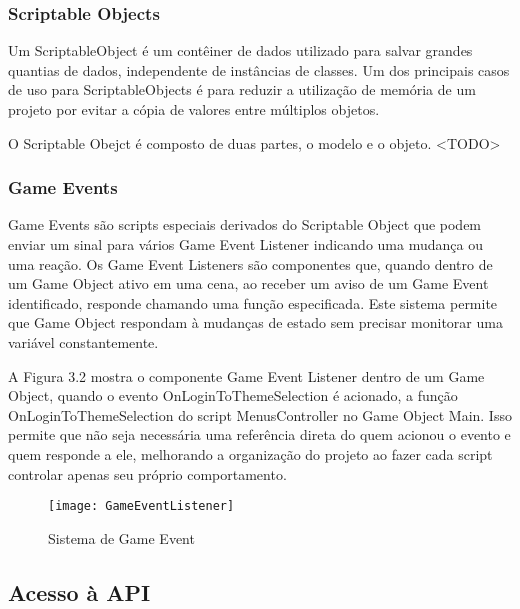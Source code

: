 \subsubsection{Scriptable Objects}
\label{subsubsec:scriptableobjects}

Um ScriptableObject é um contêiner de dados utilizado para salvar grandes quantias de dados, independente de instâncias de classes. Um dos principais casos de uso para ScriptableObjects é para reduzir a utilização de memória de um projeto por evitar a cópia de valores entre múltiplos objetos.\cite{scriptableobject}

O Scriptable Obejct é composto de duas partes, o modelo e o objeto. <TODO>

\subsubsection{Game Events}
\label{subsubsec:gameevents}

Game Events são scripts especiais derivados do Scriptable Object que podem enviar um sinal para vários Game Event Listener indicando uma mudança ou uma reação. Os Game Event Listeners são componentes que, quando dentro de um Game Object ativo em uma cena, ao receber um aviso de um Game Event identificado, responde chamando uma função especificada. Este sistema permite que Game Object respondam à mudanças de estado sem precisar monitorar uma variável constantemente.\cite{scriptableobjectarchitecture}

A Figura 3.2 mostra o componente Game Event Listener dentro de um Game Object, quando o evento OnLoginToThemeSelection é acionado, a função OnLoginToThemeSelection do script MenusController no Game Object Main. Isso permite que não seja necessária uma referência direta do quem acionou o evento e quem responde a ele, melhorando a organização do projeto ao fazer cada script controlar apenas seu próprio comportamento.

\begin{figure}[htb]
\caption{\label{fig:estrutura} Sistema de Game Event }
\begin{center}
\texttt{[image: GameEventListener]}
\end{center}
\end{figure}

\subsection{Acesso à API}
\label{subsec:acessoapi}

